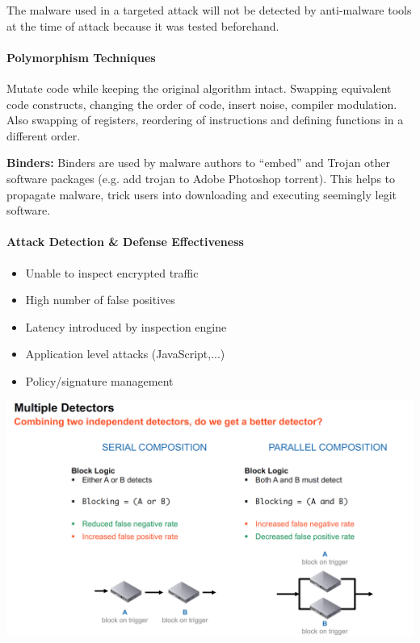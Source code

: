 The malware used in a targeted attack will not be detected by anti-malware tools at the time of attack because it was tested beforehand.

\paragraph{Polymorphism Techniques}
Mutate code while keeping the original algorithm intact. Swapping equivalent code constructs, changing the order of code, insert noise, compiler modulation. Also swapping of registers, reordering of instructions and defining functions in a different order.

\textbf{Binders:} Binders are used by malware authors to “embed” and Trojan other software packages (e.g. add trojan to Adobe Photoshop torrent). This helps to propagate malware, trick users into downloading and executing seemingly legit software. 

\paragraph{Attack Detection \& Defense Effectiveness}

\begin{itemize}
    \item Unable to inspect encrypted traffic
    \item High number of false positives
    \item Latency introduced by inspection engine
    \item Application level attacks (JavaScript,...)
    \item Policy/signature management
\end{itemize}

\begin{minipage}{\linewidth}
    \centering      
    \includegraphics[width=\linewidth]{Figures/IDS_mult_detectors.PNG} 
\end{minipage}

